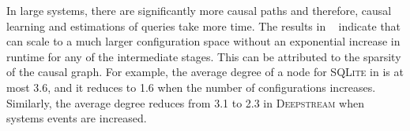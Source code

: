  In large systems, there are significantly more causal paths and therefore, causal learning and estimations of queries take more time. %
The results in ~ indicate that \ourapproach can scale to a much larger configuration space without an exponential increase in runtime for any of the intermediate stages. This can be attributed to the sparsity of the causal graph. For example, the average degree of a node for \textsc{SQLite} in  is at most 3.6, and it reduces to 1.6 when the number of configurations increases. Similarly, the average degree reduces from 3.1 to 2.3 in \textsc{Deepstream} when systems events are increased. %




